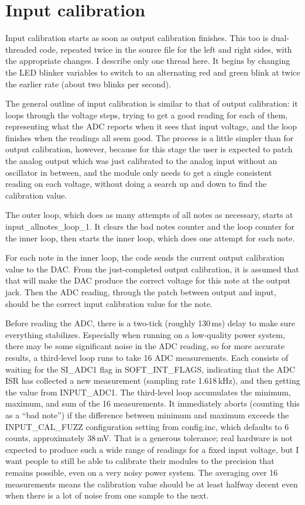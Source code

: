\section{Input calibration}

Input calibration starts as soon as output calibration finishes.  This too
is dual-threaded code, repeated twice in the source file for the left and
right sides, with the appropriate changes.  I describe only one thread here. 
It begins by changing the LED blinker variables to switch to an alternating
red and green blink at twice the earlier rate (about two blinks per second).

The general outline of input calibration is similar to that of output
calibration:  it loops through the voltage steps, trying to get a good
reading for each of them, representing what the ADC reports when it sees
that input voltage, and the loop finishes when the readings all seem good. 
The process is a little simpler than for output calibration, however,
because for this stage the user is expected to patch the analog output which
was just calibrated to the analog input without an oscillator in between,
and the module only needs to get a single consistent reading on each
voltage, without doing a search up and down to find the calibration value.

The outer loop, which does as many attempts of all notes as necessary,
starts at input\_allnotes\_loop\_1.  It clears the bad notes counter and the
loop counter for the inner loop, then starts the inner loop, which does one
attempt for each note.

For each note in the inner loop, the code sends the current output
calibration value to the DAC.  From the just-completed output calibration,
it is assumed that that will make the DAC produce the correct voltage for
this note at the output jack.  Then the ADC reading, through the patch between
output and input, should be the correct input calibration value for the
note.

Before reading the ADC, there is a two-tick (roughly 130\,ms) delay to make
sure everything stabilizes.  Especially when running on a low-quality power
system, there may be some significant noise in the ADC reading, so for more
accurate results, a third-level loop runs to take 16 ADC measurements.  Each
consists of waiting for the SI\_ADC1 flag in SOFT\_INT\_FLAGS, indicating
that the ADC ISR has collected a new measurement (sampling rate 1.618\,kHz),
and then getting the value from INPUT\_ADC1.  The third-level loop
accumulates the minimum, maximum, and sum of the 16 measurements.  It
immediately aborts (counting this as a ``bad note'') if the difference
between minimum and maximum exceeds the INPUT\_CAL\_FUZZ configuration
setting from config.inc, which defaults to 6 counts, approximately 38\,mV. 
That is a generous tolerance; real hardware is not expected to produce such
a wide range of readings for a fixed input voltage, but I want people to
still be able to calibrate their modules to the precision that remains
possible, even on a very noisy power system.  The averaging over 16
measurements means the calibration value should be at least halfway decent
even when there is a lot of noise from one sample to the next.

